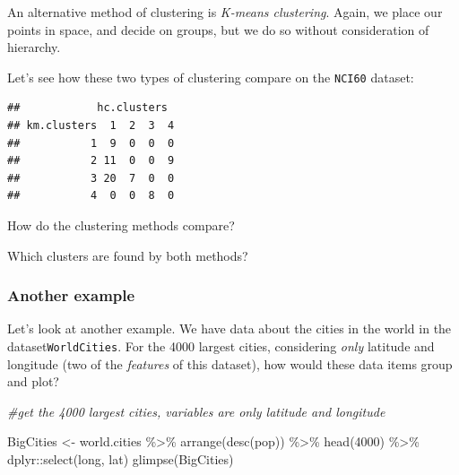\documentclass[
]{article}
\newenvironment{Shaded}{\begin{snugshade}}{\end{snugshade}}
\newcommand{\AttributeTok}[1]{\textcolor[rgb]{0.77,0.63,0.00}{#1}}
\newcommand{\CommentTok}[1]{\textcolor[rgb]{0.56,0.35,0.01}{\textit{#1}}}
\newcommand{\DecValTok}[1]{\textcolor[rgb]{0.00,0.00,0.81}{#1}}
\newcommand{\FunctionTok}[1]{\textcolor[rgb]{0.00,0.00,0.00}{#1}}
\newcommand{\NormalTok}[1]{#1}
\newcommand{\OtherTok}[1]{\textcolor[rgb]{0.56,0.35,0.01}{#1}}
\newcommand{\SpecialCharTok}[1]{\textcolor[rgb]{0.00,0.00,0.00}{#1}}
\begin{document}
An alternative method of clustering is \emph{K-means clustering}. Again,
we place our points in space, and decide on groups, but we do so without
consideration of hierarchy.

Let's see how these two types of clustering compare on the
\texttt{NCI60} dataset:

\begin{Shaded}
\end{Shaded}

\begin{verbatim}
##            hc.clusters
## km.clusters  1  2  3  4
##           1  9  0  0  0
##           2 11  0  0  9
##           3 20  7  0  0
##           4  0  0  8  0
\end{verbatim}

How do the clustering methods compare?

Which clusters are found by both methods?

\hypertarget{another-example}{%
\subsubsection{Another example}\label{another-example}}

Let's look at another example. We have data about the cities in the
world in the dataset\texttt{WorldCities}. For the 4000 largest cities,
considering \emph{only} latitude and longitude (two of the
\emph{features} of this dataset), how would these data items group and
plot?

\begin{Shaded}
\begin{Highlighting}[]
\CommentTok{\#get the 4000 largest cities, variables are only latitude and longitude}

\NormalTok{BigCities }\OtherTok{\textless{}{-}}\NormalTok{ world.cities }\SpecialCharTok{\%\textgreater{}\%}
  \FunctionTok{arrange}\NormalTok{(}\FunctionTok{desc}\NormalTok{(pop)) }\SpecialCharTok{\%\textgreater{}\%}
  \FunctionTok{head}\NormalTok{(}\DecValTok{4000}\NormalTok{) }\SpecialCharTok{\%\textgreater{}\%}
\NormalTok{  dplyr}\SpecialCharTok{::}\FunctionTok{select}\NormalTok{(long, lat)}
\FunctionTok{glimpse}\NormalTok{(BigCities)}
\end{Highlighting}
\end{Shaded}
\end{document}

